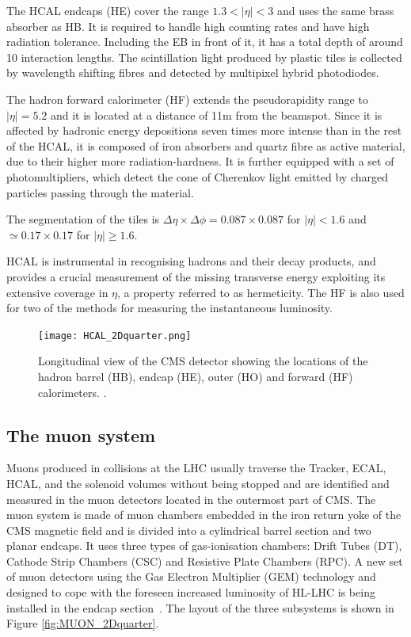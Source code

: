 The HCAL endcaps (HE) cover the range $1.3 < |\eta| < 3$ and uses the same brass absorber as HB.
It is required to handle high counting rates and have high radiation tolerance.
Including the EB in front of it, it has a total depth of around 10 interaction lengths.
The scintillation light produced by plastic tiles is collected by wavelength shifting fibres and detected by multipixel hybrid photodiodes.

The hadron forward calorimeter (HF) extends the pseudorapidity range to $|\eta| = 5.2$ and it is located at a distance of 11\usep m from the beamspot.
Since it is affected by hadronic energy depositions seven times more intense than in the rest of the HCAL,
it is composed of iron absorbers and quartz fibre as active material, due to their higher more radiation-hardness.
It is further equipped with a set of photomultipliers, which detect the cone of Cherenkov light emitted by charged particles passing through the material.

The segmentation of the tiles is $\Delta \eta \times \Delta \phi = 0.087 \times 0.087$ for $|\eta| < 1.6$ and $\simeq 0.17 \times 0.17$ for $|\eta| \ge 1.6$.

HCAL is instrumental in recognising hadrons and their decay products,
and provides a crucial measurement of the missing transverse energy exploiting its extensive coverage in $\eta$, a property referred to as hermeticity.
The HF is also used for two of the methods for measuring the instantaneous luminosity.

\begin{figure}[thb]
  \centering
  \texttt{[image: HCAL\_2Dquarter.png]}
  \caption{Longitudinal view of the CMS detector showing the locations of the hadron barrel (HB), endcap (HE), outer (HO) and forward (HF) calorimeters. \cite{CMS-CMS-00-001}.}
  \label{fig:HCAL_2Dquarter}
\end{figure}

\subsection{The muon system}
Muons produced in collisions at the LHC usually traverse the Tracker, ECAL, HCAL,
and the solenoid volumes without being stopped and are identified and measured in the muon detectors located in the outermost part of CMS.
The muon system is made of muon chambers embedded in the iron return yoke of the CMS magnetic field
and is divided into a cylindrical barrel section and two planar endcaps.
It uses three types of gas-ionisation chambers: Drift Tubes (DT), Cathode Strip Chambers (CSC) and Resistive Plate Chambers (RPC).
A new set of muon detectors using the Gas Electron Multiplier (GEM) technology
and designed to cope with the foreseen increased luminosity of HL-LHC is being installed in the endcap section~\cite{CMS-TDR-013}.
The layout of the three subsystems is shown in Figure \ref{fig:MUON_2Dquarter}.

